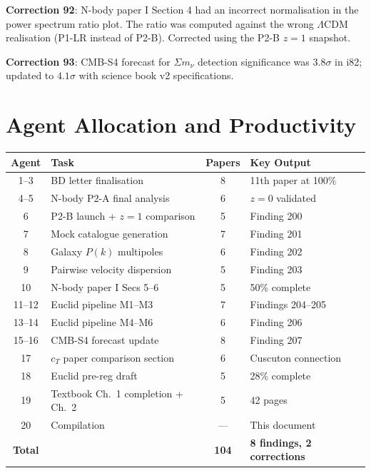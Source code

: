 \documentclass[11pt,a4paper]{article}
\begin{document}
\textbf{Correction 92}: N-body paper I Section 4 had an incorrect normalisation in the power spectrum ratio plot. The ratio was computed against the wrong $\Lambda$CDM realisation (P1-LR instead of P2-B). Corrected using the P2-B $z = 1$ snapshot.

\textbf{Correction 93}: CMB-S4 forecast for $\Sigma m_\nu$ detection significance was $3.8\sigma$ in i82; updated to $4.1\sigma$ with science book v2 specifications.

\section{Agent Allocation and Productivity}

\begin{center}
\begin{tabular}{clcl}
\toprule
\textbf{Agent} & \textbf{Task} & \textbf{Papers} & \textbf{Key Output} \\
\midrule
1--3 & BD letter finalisation & 8 & 11th paper at 100\% \\
4--5 & N-body P2-A final analysis & 6 & $z = 0$ validated \\
6 & P2-B launch + $z = 1$ comparison & 5 & Finding 200 \\
7 & Mock catalogue generation & 7 & Finding 201 \\
8 & Galaxy $P(k)$ multipoles & 6 & Finding 202 \\
9 & Pairwise velocity dispersion & 5 & Finding 203 \\
10 & N-body paper I Secs 5--6 & 5 & 50\% complete \\
11--12 & Euclid pipeline M1--M3 & 7 & Findings 204--205 \\
13--14 & Euclid pipeline M4--M6 & 6 & Finding 206 \\
15--16 & CMB-S4 forecast update & 8 & Finding 207 \\
17 & $c_T$ paper comparison section & 6 & Cuscuton connection \\
18 & Euclid pre-reg draft & 5 & 28\% complete \\
19 & Textbook Ch.\ 1 completion + Ch.\ 2 & 5 & 42 pages \\
20 & Compilation & --- & This document \\
\midrule
\textbf{Total} & & \textbf{104} & \textbf{8 findings, 2 corrections} \\
\bottomrule
\end{tabular}
\end{center}
\end{document}
